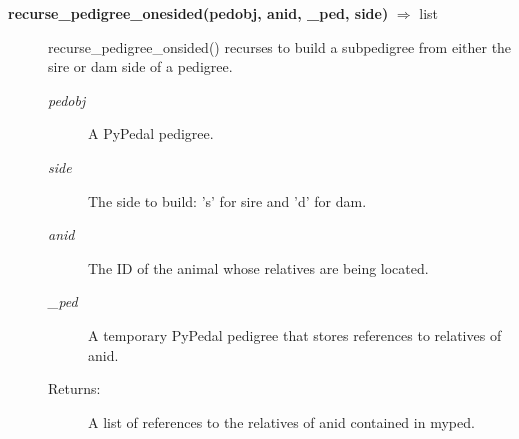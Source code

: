 \begin{description}
\item[\textbf{recurse\_pedigree\_onesided(pedobj, anid, \_ped, side)} $\Rightarrow$ list] 
recurse\_pedigree\_onsided() recurses to build a subpedigree from either the sire or dam side of a pedigree.
\begin{description}
\item[\emph{pedobj}] A PyPedal pedigree.
\item[\emph{side}] The side to build: 's' for sire and 'd' for dam.
\item[\emph{anid}] The ID of the animal whose relatives are being located.
\item[\emph{\_ped}] A temporary PyPedal pedigree that stores references to relatives of anid.
\item[Returns:] A list of references to the relatives of anid contained in myped.
\end{description}

\end{description}